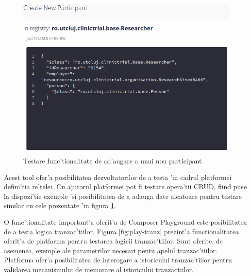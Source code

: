 \documentclass[12pt,a4paper,twoside]{report}
\begin{document}
         \begin{figure}[H]
		\begin{center}
			\includegraphics[scale=0.35]{img/play-add.png}
			\caption{Testare func'tionalitate de ad'augare a unui nou participant}
  			\label{fig:play-add}
  		\end{center}
  		\end{figure}
    Acest tool ofer'a posibilitatea dezvoltatorilor de a testa 'in cadrul platformei defini'tia re'telei. Cu ajutorul platformei pot fi testate opera'tii CRUD, fiind puse la dispozi'tie exemple 'si posibilitatea de a adauga date aleatoare pentru testare similar cu cele prezentate 'in figura \ref{fig:play-add}.

    O func'tionalitate important'a oferit'a de Composer Playground este posibilitatea de a testa logica tranzac'tiilor. Figura \ref{fig:play-tranz} prezint'a functionalitatea oferit'a de platforma pentru testarea logicii tranzac'tiilor. Sunt oferite, de asemenea, exemple ale parametrilor necesari pentu apelul tranzac'tiilor. Platforma ofer'a posibilitatea de interogare a istoricului tranzac'tiilor pentru validarea mecanismului de memorare al istoricului tranzactiilor.
    
\end{document}
